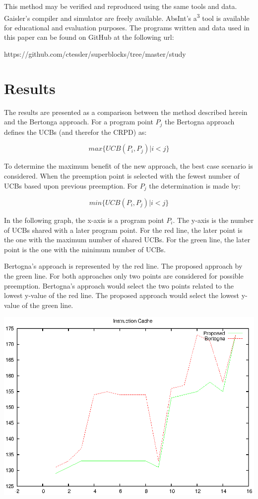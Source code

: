 \documentclass[12pt]{article}
\begin{document}
This method may be verified and reproduced using the same tools and
data. Gaisler's compiler and simulator are freely available. AbsInt's
a\textsuperscript{3} tool is available for educational and evaluation
purposes. The programs written and data used in this paper can be
found on GitHub at the following url:

\begin{center}
https://github.com/ctessler/superblocks/tree/master/study
\end{center}


\section{Results}

The results are presented as a comparison between the method described
herein and the Bertonga approach. For a program point ${P_j}$ the
Bertogna approach defines the UCBs (and therefor the CRPD) as:

\begin{equation*}
  max\{ UCB(P_i, P_j) \vert i < j \}
\end{equation*}

To determine the maximum benefit of the new approach, the best case
scenario is considered. When the preemption point is selected with the
fewest number of UCBs based upon previous preemption.  For ${P_j}$ the
determination is made by:

\begin{equation*}
  min\{ UCB(P_i, P_j) \vert i < j \}
\end{equation*}

In the following graph, the x-axis is a program point ${P_i}$. The
y-axis is the number of UCBs shared with a later program point. For
the red line, the later point is the one with the maximum number of
shared UCBs. For the green line, the later point is the one with the
minimum number of UCBs.

Bertogna's approach is represented by the red line. The proposed
approach by the green line. For both approaches only two points are
considered for possible preemption. Bertogna's approach would select
the two points related to the lowest y-value of the red line. The
proposed approach would select the lowest y-value of the green line.

\includegraphics{eps/bsort-icache.eps}
\end{document}

